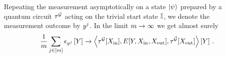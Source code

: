 \documentclass[aps,onecolumn,nofootinbib,pra]{article}
\begin{document}
    Repeating the measurement asymptotically on a state $\ket{\psi}$ prepared by a quantum circuit $\tau^{\mathcal{G}}$ acting on the trivial start state $\mathbb{I}$, we denote the measurement outcome by $y^j$.
    In the limit $m\rightarrow\infty$ we get almost surely
    \begin{align*}
        \frac{1}{m} \sum_{j\in[m]} \epsilon_{y^j}\left[Y\right] \rightarrow
        \left\langle \tau^{\mathcal{G}}[X_{\mathrm{in}}],E[Y,X_{\mathrm{in}},X_{\mathrm{out}}],\tau^{\tilde{\mathcal{G}}}[X_{\mathrm{out}}]\right\rangle \left[ Y \right] \, .
    \end{align*}
\end{document}
